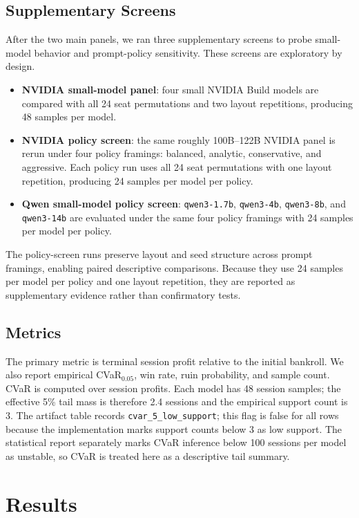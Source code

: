 \documentclass[11pt]{article}
\begin{document}
\subsection{Supplementary Screens}
After the two main panels, we ran three supplementary screens to probe small-model behavior and prompt-policy sensitivity. These screens are exploratory by design.
\begin{itemize}
    \item \textbf{NVIDIA small-model panel}: four small NVIDIA Build models are compared with all 24 seat permutations and two layout repetitions, producing 48 samples per model.
    \item \textbf{NVIDIA policy screen}: the same roughly 100B--122B NVIDIA panel is rerun under four policy framings: balanced, analytic, conservative, and aggressive. Each policy run uses all 24 seat permutations with one layout repetition, producing 24 samples per model per policy.
    \item \textbf{Qwen small-model policy screen}: \texttt{qwen3-1.7b}, \texttt{qwen3-4b}, \texttt{qwen3-8b}, and \texttt{qwen3-14b} are evaluated under the same four policy framings with 24 samples per model per policy.
\end{itemize}
The policy-screen runs preserve layout and seed structure across prompt framings, enabling paired descriptive comparisons. Because they use 24 samples per model per policy and one layout repetition, they are reported as supplementary evidence rather than confirmatory tests.

\subsection{Metrics}
The primary metric is terminal session profit relative to the initial bankroll. We also report empirical CVaR$_{0.05}$, win rate, ruin probability, and sample count. CVaR is computed over session profits. Each model has 48 session samples; the effective 5\% tail mass is therefore 2.4 sessions and the empirical support count is 3. The artifact table records \texttt{cvar\_5\_low\_support}; this flag is false for all rows because the implementation marks support counts below 3 as low support. The statistical report separately marks CVaR inference below 100 sessions per model as unstable, so CVaR is treated here as a descriptive tail summary.

\section{Results}
\end{document}
